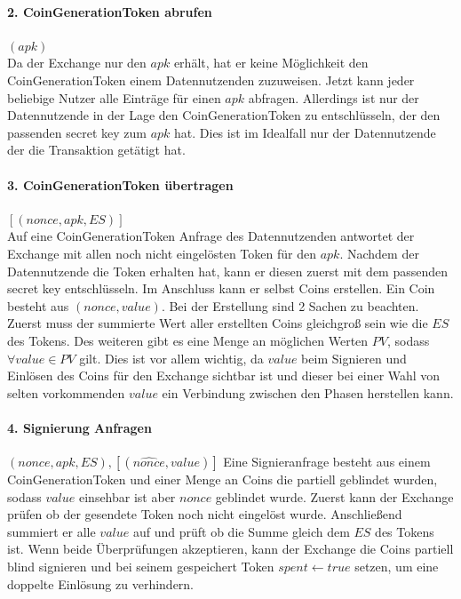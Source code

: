 \documentclass[11pt,a4paper]{scrreprt}
\begin{document}
\paragraph{2. CoinGenerationToken abrufen} $(apk)$\\
Da der Exchange nur den $apk$ erhält, hat er keine Möglichkeit den CoinGenerationToken einem Datennutzenden zuzuweisen. Jetzt kann jeder beliebige Nutzer alle Einträge für einen $apk$ abfragen. Allerdings ist nur der Datennutzende in der Lage den CoinGenerationToken zu entschlüsseln, der den passenden secret key zum $apk$ hat. Dies ist im Idealfall nur der Datennutzende der die Transaktion getätigt hat.

\paragraph{3. CoinGenerationToken übertragen} $[(nonce, apk, ES)]$\\
Auf eine CoinGenerationToken Anfrage des Datennutzenden antwortet der Exchange mit allen noch nicht eingelösten Token für den $apk$. Nachdem der Datennutzende die Token erhalten hat, kann er diesen zuerst mit dem passenden secret key entschlüsseln. Im Anschluss kann er selbst Coins erstellen. Ein Coin besteht aus $(nonce, value)$. Bei der Erstellung sind 2 Sachen zu beachten. Zuerst muss der summierte Wert aller erstellten Coins gleichgroß sein wie die $ES$ des Tokens. Des weiteren gibt es eine Menge an möglichen Werten $PV$, sodass $\forall value\in  PV$ gilt. Dies ist vor allem wichtig, da $value$ beim Signieren und Einlösen des Coins für den Exchange sichtbar ist und dieser bei einer Wahl von selten vorkommenden $value$ ein Verbindung zwischen den Phasen herstellen kann.

\paragraph{4. Signierung Anfragen} $(nonce, apk, ES), [(\widehat{nonce},value)]$
Eine Signieranfrage besteht aus einem CoinGenerationToken und einer Menge an Coins die partiell geblindet wurden, sodass $value$ einsehbar ist aber $nonce$ geblindet wurde. Zuerst kann der Exchange prüfen ob der gesendete Token noch nicht eingelöst wurde. Anschließend summiert er alle $value$ auf und prüft ob die Summe gleich dem $ES$ des Tokens ist. Wenn beide Überprüfungen akzeptieren, kann der Exchange die Coins partiell blind signieren und bei seinem gespeichert Token $spent \leftarrow true$ setzen, um eine doppelte Einlösung zu verhindern.\\\\
\end{document}
